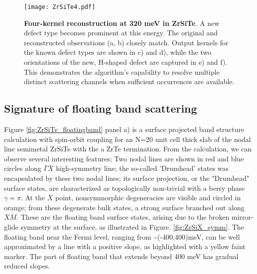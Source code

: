 \begin{figure}
	\texttt{[image: ZrSiTe4.pdf]} 
	\centering
	\caption[\textbf{Four-kernel reconstruction at 320 meV in ZrSiTe}]{\textbf{Four-kernel reconstruction at 320 meV in ZrSiTe}. A new defect type becomes prominent at this energy. The original and reconstructed observations (a, b) closely match. Output kernels for the known defect types are shown in c) and d), while the two orientations of the new, H-shaped defect are captured in e) and f). This demonstrates the algorithm’s capability to resolve multiple distinct scattering channels when sufficient occurrences are available.}
	\label{fig:ZrSiTe4}
\end{figure}

\subsection{Signature of floating band scattering}
Figure \ref{fig:ZrSiTe_floatingband} panel a) is a surface projected band structure calculation with spin-orbit coupling for an N=20 unit cell thick slab of the nodal line semimetal ZrSiTe with the a ZrTe termination. From the calculation, we can observe several interesting features; Two nodal lines are shown in red and blue circles along $\bar{\Gamma}\bar{X}$ high-symmetry line; the so-called 'Drumhead' states was encapsulated by these two nodal lines; its surface projection, or the "Drumhead" surface states, are characterized as topologically non-trivial with a berry phase $\gamma = \pi$. At the $\bar{X}$ point, nonsymmorphic degeneracies are visible and circled in orange; from these degenerate bulk states, a strong surface branched out along $\bar{X}\bar{M}$. These are the floating band surface states, arising due to the broken mirror-glide symmetry at the surface, as illustrated in Figure. \ref{fig:ZrSiX_symm}. The floating band near the Fermi level, ranging from \textasciitilde (-400,400)meV, can be well approximated by a line with a positive slope, as highlighted with a yellow faint marker. The part of floating band that extends beyond 400 meV has gradual reduced slopes. 

